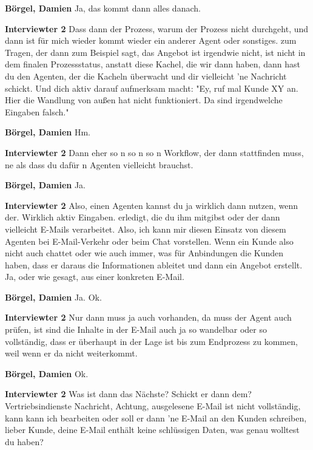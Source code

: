 \textbf{Börgel, Damien}\newline
Ja, das kommt dann alles danach.

\textbf{Interviewter 2}\newline
Dass dann der Prozess, warum der Prozess nicht durchgeht, und dann ist für mich wieder kommt wieder ein anderer Agent oder sonstiges.
zum Tragen, der dann zum Beispiel sagt, das Angebot ist irgendwie nicht, ist nicht in dem finalen Prozessstatus, anstatt diese Kachel, die wir dann haben, dann hast du den Agenten, der die Kacheln überwacht und dir vielleicht 'ne Nachricht schickt.
Und dich aktiv darauf aufmerksam macht: "Ey, ruf mal Kunde XY an. Hier die Wandlung von außen hat nicht funktioniert. Da sind irgendwelche Eingaben falsch."

\textbf{Börgel, Damien}\newline
Hm.

\textbf{Interviewter 2}\newline
Dann eher so n so n so n Workflow, der dann stattfinden muss, ne als dass du dafür n Agenten vielleicht brauchst.

\textbf{Börgel, Damien}\newline
Ja.

\textbf{Interviewter 2}\newline
Also, einen Agenten kannst du ja wirklich dann nutzen, wenn der.
Wirklich aktiv Eingaben.
erledigt, die du ihm mitgibst oder der dann vielleicht E-Mails verarbeitet. Also, ich kann mir diesen Einsatz von diesem Agenten bei E-Mail-Verkehr oder beim Chat vorstellen. Wenn ein Kunde also nicht auch chattet oder wie auch immer, was für Anbindungen die Kunden haben, dass er daraus die Informationen ableitet und dann ein Angebot erstellt. Ja, oder wie gesagt, aus einer konkreten E-Mail.

\textbf{Börgel, Damien}\newline
Ja. Ok.

\textbf{Interviewter 2}\newline
Nur dann muss ja auch vorhanden, da muss der Agent auch prüfen, ist sind die Inhalte in der E-Mail auch ja so wandelbar oder so vollständig, dass er überhaupt in der Lage ist bis zum Endprozess zu kommen, weil wenn er da nicht weiterkommt.

\textbf{Börgel, Damien}\newline
Ok.

\textbf{Interviewter 2}\newline
Was ist dann das Nächste? Schickt er dann dem?
Vertriebsindienste Nachricht, Achtung, ausgelesene E-Mail ist nicht vollständig, kann kann ich bearbeiten oder soll er dann 'ne E-Mail an den Kunden schreiben, lieber Kunde, deine E-Mail enthält keine schlüssigen Daten, was genau wolltest du haben?

